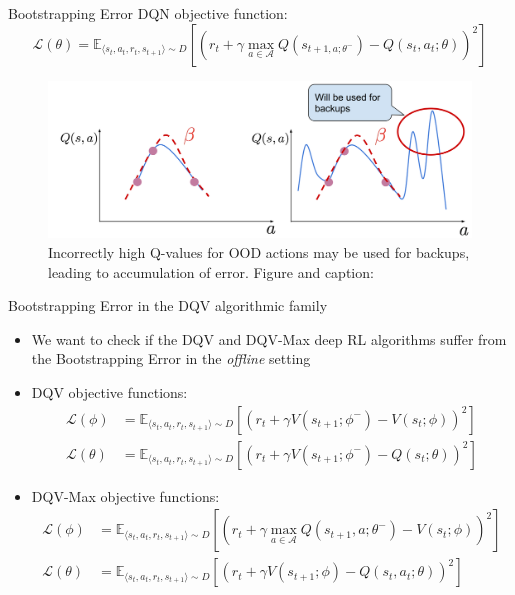 \documentclass[presentation]{beamer}
\begin{document}
\begin{frame}[label={sec:org537c921}]{Bootstrapping Error}
DQN objective function:
\begin{equation*}
\mathcal{L}(\theta) = \mathbb{E}_{\langle s_t, a_t, r_t, s_{t+1} \rangle \sim D}\left[(r_t + \gamma \max_{a\in\mathcal{A}}Q(s_{t+1,a;\theta^{-}}) - Q(s_t, a_t;\theta))^2\right]
\end{equation*}

\begin{figure}[htbp]
\centering
\includegraphics[width=.9\linewidth]{./bootstrap_error_offline_rl.png}
\caption{\label{fig:org7890d7a}Incorrectly high Q-values for OOD actions may be used for backups, leading to accumulation of error. Figure and caption: \citeauthor{kumar}}
\end{figure}
\end{frame}

\begin{frame}[label={sec:org8d94f9a}]{Bootstrapping Error in the DQV\cite{sabatelli2020deep} algorithmic family}
\begin{itemize}
\item We want to check if the DQV and DQV-Max deep RL algorithms suffer
from the Bootstrapping Error in the \emph{offline} setting
\item DQV objective functions:
\fontsize{9pt}{10pt}\selectfont
\begin{align}
\mathcal{L}(\phi) &= \mathbb{E}_{\langle s_t, a_t, r_t, s_{t+1} \rangle \sim D}\left[(r_t + \gamma V(s_{t+1};\phi^{-}) - V(s_t;\phi))^2\right] \\
\mathcal{L}(\theta) &= \mathbb{E}_{\langle s_t, a_t, r_t, s_{t+1} \rangle \sim D}\left[(r_t + \gamma V(s_{t+1};\phi^{-}) - Q(s_t;\theta))^2\right]
\end{align}
\item DQV-Max objective functions:
\fontsize{9pt}{10pt}\selectfont
\begin{align}
\label{eq:org2ddb2f3}
\mathcal{L}(\phi) &= \mathbb{E}_{\langle s_t, a_t, r_t, s_{t+1} \rangle \sim D}\left[(r_t + \gamma \max_{a\in\mathcal{A}}Q(s_{t+1},a;\theta^{-}) - V(s_t;\phi))^2\right] \\
\mathcal{L}(\theta) &= \mathbb{E}_{\langle s_t, a_t, r_t, s_{t+1} \rangle \sim D}\left[(r_t + \gamma V(s_{t+1};\phi) - Q(s_t, a_t;\theta))^2\right]
\end{align}
\end{itemize}
\end{frame}
\end{document}
